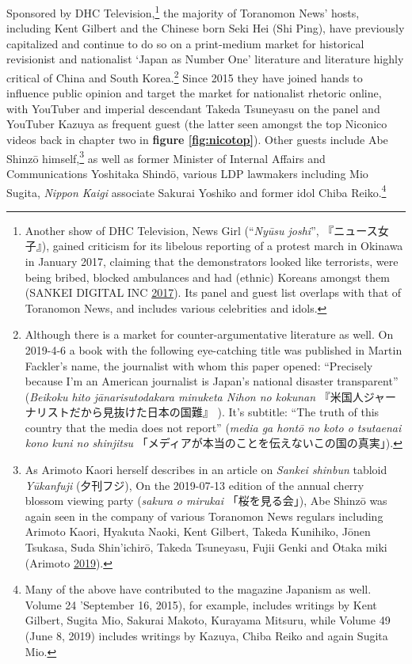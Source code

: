 \documentclass[10pt,british,A4paper,,openany]{memoir}
\begin{document}
Sponsored by DHC Television,\footnote{Another show of DHC Television,
  News Girl (``\emph{Nyūsu joshi}'', 『ニュース女子』), gained criticism
  for its libelous reporting of a protest march in Okinawa in January
  2017, claiming that the demonstrators looked like terrorists, were
  being bribed, blocked ambulances and had (ethnic) Koreans amongst them
  (SANKEI DIGITAL INC
  \protect\hyperlink{ref-sankei_digital_inc_eng._2017}{2017}). Its panel
  and guest list overlaps with that of Toranomon News, and includes
  various celebrities and idols.} the majority of Toranomon News' hosts,
including Kent Gilbert and the Chinese born Seki Hei (Shi Ping), have
previously capitalized and continue to do so on a print-medium market
for historical revisionist and nationalist `Japan as Number One'
literature and literature highly critical of China and South
Korea.\footnote{Although there is a market for counter-argumentative
  literature as well. On 2019-4-6 a book with the following eye-catching
  title was published in Martin Fackler's name, the journalist with whom
  this paper opened: ``Precisely because I'm an American journalist is
  Japan's national disaster transparent'' (\emph{Beikoku hito
  jānarisutodakara minuketa Nihon no kokunan}
  『米国人ジャーナリストだから見抜けた日本の国難』 ). It's subtitle:
  ``The truth of this country that the media does not report''
  (\emph{media ga hontō no koto o tsutaenai kono kuni no shinjitsu}
  「メディアが本当のことを伝えないこの国の真実」).} Since 2015 they have
joined hands to influence public opinion and target the market for
nationalist rhetoric online, with YouTuber and imperial descendant
Takeda Tsuneyasu on the panel and YouTuber Kazuya as frequent guest (the
latter seen amongst the top Niconico videos back in chapter two in
\textbf{figure \ref{fig:nicotop}}). Other guests include Abe Shinzō
himself,\footnote{As Arimoto Kaori herself describes in an article on
  \emph{Sankei shinbun} tabloid \emph{Yūkanfuji} (夕刊フジ), On the
  2019-07-13 edition of the annual cherry blossom viewing party
  (\emph{sakura o mirukai} 「桜を見る会」), Abe Shinzō was again seen in
  the company of various Toranomon News regulars including Arimoto
  Kaori, Hyakuta Naoki, Kent Gilbert, Takeda Kunihiko, Jōnen Tsukasa,
  Suda Shin'ichirō, Takeda Tsuneyasu, Fujii Genki and Ōtaka miki
  (Arimoto \protect\hyperlink{ref-arimoto_eng._2019}{2019}).} as well as
former Minister of Internal Affairs and Communications Yoshitaka Shindō,
various LDP lawmakers including Mio Sugita, \emph{Nippon Kaigi}
associate Sakurai Yoshiko and former idol Chiba Reiko.\footnote{Many of
  the above have contributed to the magazine Japanism as well. Volume 24
  'September 16, 2015), for example, includes writings by Kent Gilbert,
  Sugita Mio, Sakurai Makoto, Kurayama Mitsuru, while Volume 49 (June 8,
  2019) includes writings by Kazuya, Chiba Reiko and again Sugita Mio.}
\end{document}
